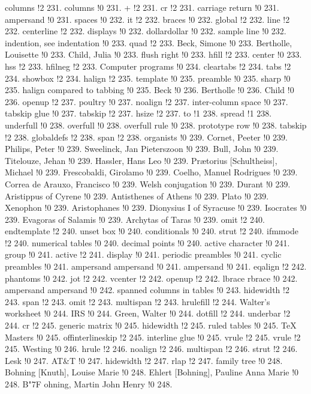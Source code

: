 columns !2 231.
columns !0 231.
+ !2 231.
cr !2 231.
carriage return !0 231.
ampersand !0 231.
spaces !0 232.
it !2 232.
braces !0 232.
global !2 232.
line !2 232.
centerline !2 232.
displays !0 232.
dollardollar !0 232.
sample line !0 232.
indention, see indentation !0 233.
quad !2 233.
Beck, Simone !0 233.
Bertholle, Louisette !0 233.
Child, Julia !0 233.
flush right !0 233.
hfill !2 233.
center !0 233.
hss !2 233.
hfilneg !2 233.
Computer programs !0 234.
cleartabs !2 234.
tabs !2 234.
showbox !2 234.
halign !2 235.
template !0 235.
preamble !0 235.
sharp !0 235.
halign compared to tabbing !0 235.
Beck !0 236.
Bertholle !0 236.
Child !0 236.
openup !2 237.
poultry !0 237.
noalign !2 237.
inter-column space !0 237.
tabskip glue !0 237.
tabskip !2 237.
hsize !2 237.
to !1 238.
spread !1 238.
underfull !0 238.
overfull !0 238.
overfull rule !0 238.
prototype row !0 238.
tabskip !2 238.
globaldefs !2 238.
span !2 238.
organists !0 239.
Cornet, Peeter !0 239.
Philips, Peter !0 239.
Sweelinck, Jan Pieterszoon !0 239.
Bull, John !0 239.
Titelouze, Jehan !0 239.
Hassler, Hans Leo !0 239.
Pr\ae torius [Schultheiss], Michael !0 239.
Frescobaldi, Girolamo !0 239.
Coelho, Manuel Rodrigues !0 239.
Correa de Arauxo, Francisco !0 239.
Welsh conjugation !0 239.
Durant !0 239.
Aristippus of Cyrene !0 239.
Antisthenes of Athens !0 239.
Plato !0 239.
Xenophon !0 239.
Aristophanes !0 239.
Dionysius I of Syracuse !0 239.
Isocrates !0 239.
Evagoras of Salamis !0 239.
Archytas of Taras !0 239.
omit !2 240.
endtemplate !2 240.
unset box !0 240.
conditionals !0 240.
strut !2 240.
ifmmode !2 240.
numerical tables !0 240.
decimal points !0 240.
active character !0 241.
group !0 241.
active !2 241.
display !0 241.
periodic preambles !0 241.
cyclic preambles !0 241.
ampersand ampersand !0 241.
ampersand !0 241.
eqalign !2 242.
phantoms !0 242.
jot !2 242.
vcenter !2 242.
openup !2 242.
lbrace rbrace !0 242.
ampersand ampersand !0 242.
spanned columns in tables !0 243.
hidewidth !2 243.
span !2 243.
omit !2 243.
multispan !2 243.
hrulefill !2 244.
Walter's worksheet !0 244.
IRS !0 244.
Green, Walter !0 244.
dotfill !2 244.
underbar !2 244.
cr !2 245.
generic matrix !0 245.
hidewidth !2 245.
ruled tables !0 245.
TeX Masters !0 245.
offinterlineskip !2 245.
interline glue !0 245.
vrule !2 245.
vrule !2 245.
Westing !0 246.
hrule !2 246.
noalign !2 246.
multispan !2 246.
strut !2 246.
Lesk !0 247.
AT\&T !0 247.
hidewidth !2 247.
rlap !2 247.
family tree !0 248.
Bohning [Knuth], Louise Marie !0 248.
Ehlert [Bohning], Pauline Anna Marie !0 248.
B{\accent "7F o}hning, Martin John Henry !0 248.

